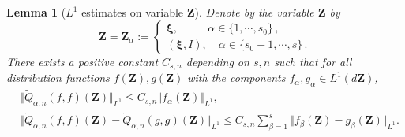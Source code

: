 \documentclass[reqno,11pt]{amsart}
\newtheorem{lemma}{Lemma}[section]
\numberwithin{equation}{section}
\begin{document}
\begin{lemma}[$L^1$ estimates on variable $\mathbf{Z}$]\label{Lemma 4.13}
	Denote by the variable $\mathbf{Z}$ by
\begin{equation*}
		\mathbf{Z} =\mathbf{Z}_\alpha :=
		\begin{cases}
			\mathbf{\xi } , \qquad \enspace \, \alpha \in \{1,\cdots , s_0 \} \,, \\
			(\mathbf\xi , I )  , \quad \alpha \in \{s_0 +1,\cdots , s \} \,.
		\end{cases}
	\end{equation*}
There exists a positive constant $C_{s, n}$ depending on $s ,n$ such that for all distribution functions $f (\mathbf{Z}), g(\mathbf{Z} ) $ with the components $f_\alpha , g_\alpha \in L^1(d \mathbf{Z})$, 
	\begin{equation*}
		\begin{aligned}
			& \Vert \tilde{Q}_{\alpha , n} (f,f) (\mathbf{Z}) \Vert_{L^1}\leq C_{s , n} \Vert f_{\alpha} (\mathbf{Z}) \Vert_{L^1}, \\
			& \Vert \tilde{Q}_{\alpha , n} (f,f) (\mathbf{Z}) -\tilde{Q}_{\alpha , n} (g,g ) (\mathbf{Z}) \Vert_{L^1} \leq C_{s , n} \sum_{\beta = 1}^{s} \Vert f_\beta (\mathbf{Z}) -g_\beta (\mathbf{Z}) \Vert_{L^1}.
		\end{aligned}
	\end{equation*}
\end{lemma} 
\end{document}
